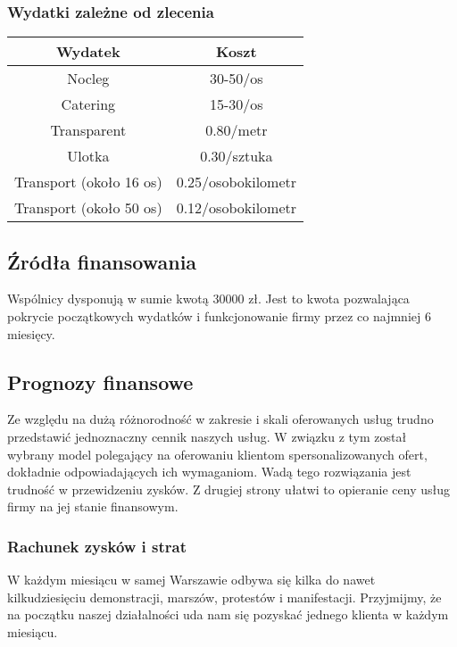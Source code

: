 \documentclass{article}
\begin{document}
\subsubsection{Wydatki zależne od zlecenia}
\begin{table}[!ht]
\label{table2}
\vspace{0.3cm}
\hspace{-2cm}
\centering
\begin{tabular}{|c|c|}
\hline
Wydatek & Koszt \\
\hline
Nocleg & 30-50/os \\
Catering & 15-30/os \\
Transparent & 0.80/metr \\
Ulotka & 0.30/sztuka \\
Transport (około 16 os) & 0.25/osobokilometr \\
Transport (około 50 os) & 0.12/osobokilometr \\
\hline
\end{tabular}
\end{table}

\subsection{Źródła finansowania}
Wspólnicy dysponują w sumie kwotą 30000 zł. Jest to kwota pozwalająca pokrycie początkowych wydatków i funkcjonowanie firmy przez co najmniej 6 miesięcy.

\subsection{Prognozy finansowe}
Ze względu na dużą różnorodność w zakresie i skali oferowanych usług trudno przedstawić jednoznaczny cennik naszych usług. W związku z tym został wybrany model polegający na oferowaniu klientom spersonalizowanych ofert, dokładnie odpowiadających ich wymaganiom. Wadą tego rozwiązania jest trudność w przewidzeniu zysków. Z drugiej strony ułatwi to opieranie ceny usług firmy na jej stanie finansowym.

\subsubsection{Rachunek zysków i strat}
W każdym miesiącu w samej Warszawie odbywa się kilka do nawet kilkudziesięciu demonstracji, marszów, protestów i manifestacji. Przyjmijmy, że na początku naszej działalności uda nam się pozyskać jednego klienta w każdym miesiącu.
\end{document}

